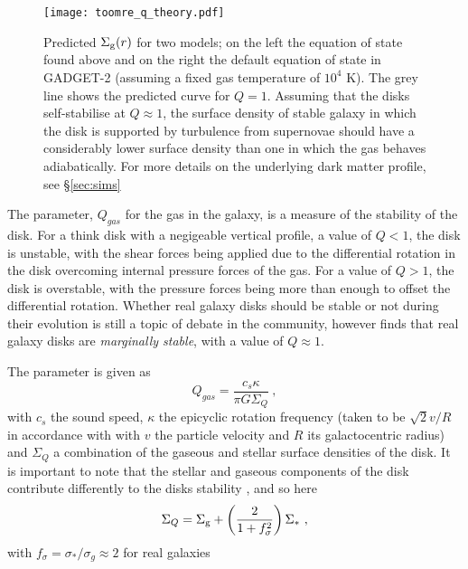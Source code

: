 \begin{figure}[ht]
    \centering
    \texttt{[image: toomre\_q\_theory.pdf]}
    \caption{Predicted $\Sigma_\mathrm{g}(r)$ for two models; on the left the equation of state found above and on the right the default equation of state in GADGET-2 (assuming a fixed gas temperature of $10^4$ K). The grey line shows the predicted curve for $Q=1$. Assuming that the disks self-stabilise at $Q\approx1$, the surface density of stable galaxy in which the disk is supported by turbulence from supernovae should have a considerably lower surface density than one in which the gas behaves adiabatically. For more details on the underlying dark matter profile, see \S \ref{sec:sims}}
    \label{fig:toomreqthr}
\end{figure}

The \citet{toomre_gravitational_1964} parameter, $Q_{gas}$ for the gas in the galaxy, is a measure of the stability of the disk.
For a think disk with a negigeable vertical profile, a value of $Q<1$, the disk is unstable, with the shear forces being applied due to the differential rotation in the disk overcoming internal pressure forces of the gas.
For a value of $Q>1$, the disk is overstable, with the pressure forces being more than enough to offset the differential rotation.
Whether real galaxy disks should be stable or not during their evolution is still a topic of debate in the community, however \citet{hopkins_stellar_2012} finds that real galaxy disks are \emph{marginally stable}, with a value of $Q \approx 1$.

The \citet{toomre_gravitational_1964} parameter is given as
\begin{equation}
    Q_{gas} = \frac{c_s \kappa}{\pi G \Sigma_Q}~,
    \label{eqn:Q}
\end{equation}
with $c_s$ the sound speed, $\kappa$ the epicyclic rotation frequency (taken to be $\sqrt{2} v/R$ in accordance with \citet{livermore_resolved_2015} with $v$ the particle velocity and $R$ its galactocentric radius) and $\Sigma_Q$ a combination of the gaseous and stellar surface densities of the disk.
It is important to note that the stellar and gaseous components of the disk contribute differently to the disks stability \citep{rafikov_local_2001}, and so here
\begin{equation}
    \Sigma_Q = \Sigma_\mathrm{g}  + \left(\frac{2}{1 + f_\sigma^2}\right)\Sigma_*~,
    \label{eqn:sgq}
\end{equation}
with $f_\sigma = \sigma_*/\sigma_g \approx 2$ for real galaxies \citep{korchagin_local_2003}

